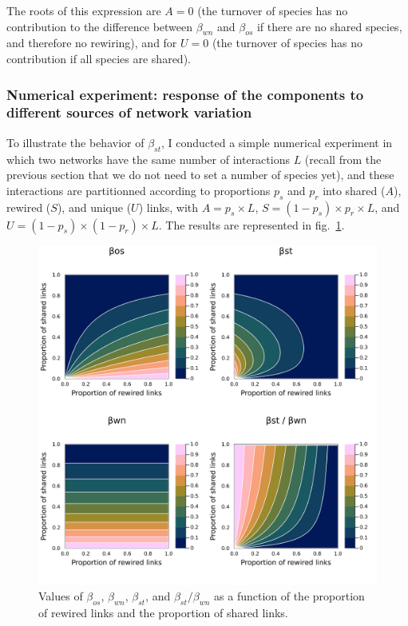 \documentclass[10pt,oneside]{article}
\makeatletter
\def\maxwidth{\ifdim\Gin@nat@width>\linewidth\linewidth
\else\Gin@nat@width\fi}
\let\Oldincludegraphics\includegraphics
\renewcommand{\includegraphics}[1]{\Oldincludegraphics[width=\maxwidth]{#1}}
\makeatother
\begin{document}
The roots of this expression are \(A=0\) (the turnover of species has no
contribution to the difference between \(\beta_{wn}\) and \(\beta_{os}\)
if there are no shared species, and therefore no rewiring), and for
\(U = 0\) (the turnover of species has no contribution if all species
are shared).

\hypertarget{numerical-experiment-response-of-the-components-to-different-sources-of-network-variation}{%
\subsubsection{Numerical experiment: response of the components to
different sources of network
variation}\label{numerical-experiment-response-of-the-components-to-different-sources-of-network-variation}}

To illustrate the behavior of \(\beta_{st}\), I conducted a simple
numerical experiment in which two networks have the same number of
interactions \(L\) (recall from the previous section that we do not need
to set a number of species yet), and these interactions are partitionned
according to proportions \(p_s\) and \(p_r\) into shared (\(A\)),
rewired (\(S\)), and unique (\(U\)) links, with \(A = p_s\times L\),
\(S = (1-p_s)\times p_r\times L\), and
\(U = (1-p_s)\times (1-p_r)\times L\). The results are represented in
fig.~\ref{fig:numexp1}.

\begin{figure}
\hypertarget{fig:numexp1}{%
\centering
\includegraphics{figures/numexp1.png}
\caption{Values of \(\beta_{os}\), \(\beta_{wn}\), \(\beta_{st}\), and
\(\beta_{st}/\beta_{wn}\) as a function of the proportion of rewired
links and the proportion of shared links.}\label{fig:numexp1}
}
\end{figure}
\end{document}
